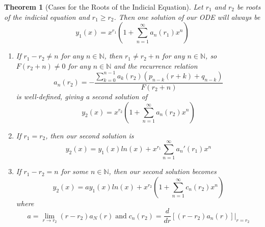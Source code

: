 \documentclass[12pt]{article}
\newtheorem{thm}{Theorem}[section]
\theoremstyle{definition}
\theoremstyle{remark}
\numberwithin{equation}{section}
\newcommand\N{\mathbb N}    %
\begin{document}
\vspace{1cm}

\begin{thm}[Cases for the Roots of the Indicial Equation]
        Let $r_1$ and $r_2$ be roots of the indicial equation and $r_1 \geq r_2$. Then one solution of our ODE will always be \begin{equation}
                y_1(x) = x^{r_1}\left(1 + \sum\limits_{n=1}^{\infty}a_n(r_1)x^n\right)
        \end{equation}
        \begin{enumerate}
                \item If $r_1 - r_2 \neq n$ for any $n \in \N$, then $r_1 \neq r_2 + n$ for any $n \in \N$, so $F(r_2 + n) \neq 0$ for any $n \in \N$ and the recurrence relation \begin{equation}
                a_n(r_2) = -\frac{\sum\limits_{k=0}^{n-1}a_k(r_2)(p_{n-k}(r+k)+q_{n-k})}{F(r_2+n)}
                \end{equation}
                is well-defined, giving a second solution of \begin{equation}
                        y_2(x) = x^{r_2}\left(1 + \sum\limits_{n=1}^{\infty}a_n(r_2)x^n\right)
                \end{equation}
                \item If $r_1 = r_2$, then our second solution is \begin{equation}
                                y_2(x) = y_1(x)ln(x) + x^{r_1}\sum\limits_{n=1}^{\infty}a_n'(r_1)x^n                      
                        \end{equation}
                \item If $r_1 - r_2 = n$ for some $n \in \N$, then our second solution becomes \begin{equation}
                                y_2(x) = ay_1(x)ln(x) + x^{r_2}\left(1 + \sum\limits_{n=1}^{\infty}c_n(r_2)x^n\right)
                        \end{equation}
                        where \begin{equation}
                                a =\lim\limits_{r \rightarrow r_2}(r-r_2)a_N(r)\;\text{and}\;c_n(r_2)=\frac{d}{dr}\left[(r-r_2)a_n(r)\right]\bigg\rvert_{r=r_2}
                        \end{equation}
        \end{enumerate}
\end{thm}




\clearpage
\end{document}
